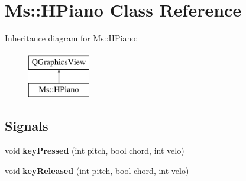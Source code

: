 \hypertarget{class_ms_1_1_h_piano}{}\section{Ms\+:\+:H\+Piano Class Reference}
\label{class_ms_1_1_h_piano}
Inheritance diagram for Ms\+:\+:H\+Piano\+:\begin{figure}[H]
\begin{center}
\leavevmode
\includegraphics[height=2.000000cm]{class_ms_1_1_h_piano}
\end{center}
\end{figure}
\subsection*{Signals}
\begin{DoxyCompactItemize}
\item 
\mbox{\label{class_ms_1_1_h_piano_a79ea00499a89bc59e640590df9aa6221}} 
void {\bfseries key\+Pressed} (int pitch, bool chord, int velo)
\item 
\mbox{\label{class_ms_1_1_h_piano_a4d26c79136104f4933f95720407143f9}} 
void {\bfseries key\+Released} (int pitch, bool chord, int velo)
\end{DoxyCompactItemize}
